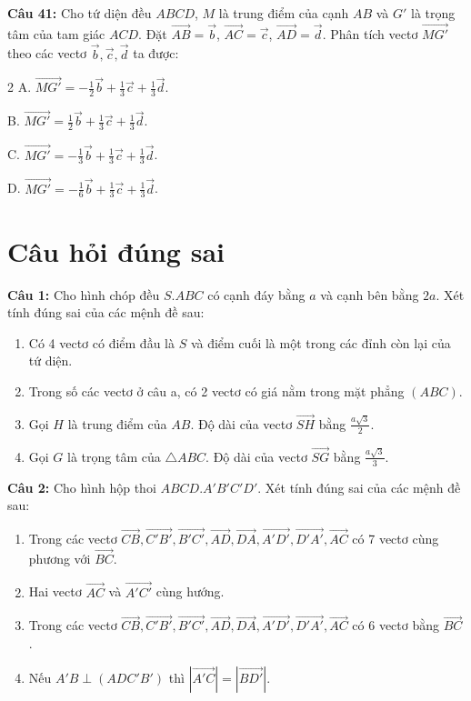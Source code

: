 \documentclass[12pt]{article}
\begin{document}
	\vspace{0.2cm}
	\noindent \textbf{Câu 41:} Cho tứ diện đều $ABCD$, $M$ là trung điểm của cạnh $AB$ và $G'$ là trọng tâm của tam giác $ACD$. Đặt $\overrightarrow{AB} = \vec{b}$, $\overrightarrow{AC} = \vec{c}$, $\overrightarrow{AD} = \vec{d}$. Phân tích vectơ $\overrightarrow{MG'}$ theo các vectơ $\vec{b}, \vec{c}, \vec{d}$ ta được:
	\begin{multicols}{2}
		A. $\overrightarrow{MG'} = -\frac{1}{2}\vec{b} + \frac{1}{3}\vec{c} + \frac{1}{3}\vec{d}$. \par
		B. $\overrightarrow{MG'} = \frac{1}{2}\vec{b} + \frac{1}{3}\vec{c} + \frac{1}{3}\vec{d}$. \par
		C. $\overrightarrow{MG'} = -\frac{1}{3}\vec{b} + \frac{1}{3}\vec{c} + \frac{1}{3}\vec{d}$. \par
		D. $\overrightarrow{MG'} = -\frac{1}{6}\vec{b} + \frac{1}{3}\vec{c} + \frac{1}{3}\vec{d}$.
	\end{multicols}
	\section{Câu hỏi đúng sai}
	
	\noindent \textbf{Câu 1:} Cho hình chóp đều $S.ABC$ có cạnh đáy bằng $a$ và cạnh bên bằng $2a$. Xét tính đúng sai của các mệnh đề sau:
	\begin{enumerate}[label=\alph*)]
		\item Có 4 vectơ có điểm đầu là $S$ và điểm cuối là một trong các đỉnh còn lại của tứ diện.
		\item Trong số các vectơ ở câu a, có 2 vectơ có giá nằm trong mặt phẳng $(ABC)$.
		\item Gọi $H$ là trung điểm của $AB$. Độ dài của vectơ $\overrightarrow{SH}$ bằng $\frac{a\sqrt{3}}{2}$.
		\item Gọi $G$ là trọng tâm của $\triangle ABC$. Độ dài của vectơ $\overrightarrow{SG}$ bằng $\frac{a\sqrt{3}}{3}$.
	\end{enumerate}
	
	\vspace{0.2cm}
	\noindent \textbf{Câu 2:} Cho hình hộp thoi $ABCD.A'B'C'D'$. Xét tính đúng sai của các mệnh đề sau:
	\begin{enumerate}[label=\alph*)]
		\item Trong các vectơ $\overrightarrow{CB}, \overrightarrow{C'B'}, \overrightarrow{B'C'}, \overrightarrow{AD}, \overrightarrow{DA}, \overrightarrow{A'D'}, \overrightarrow{D'A'}, \overrightarrow{AC}$ có 7 vectơ cùng phương với $\overrightarrow{BC}$.
		\item Hai vectơ $\overrightarrow{AC}$ và $\overrightarrow{A'C'}$ cùng hướng.
		\item Trong các vectơ $\overrightarrow{CB}, \overrightarrow{C'B'}, \overrightarrow{B'C'}, \overrightarrow{AD}, \overrightarrow{DA}, \overrightarrow{A'D'}, \overrightarrow{D'A'}, \overrightarrow{AC}$ có 6 vectơ bằng $\overrightarrow{BC}$.
		\item Nếu $A'B \perp (ADC'B')$ thì $|\overrightarrow{A'C}| = |\overrightarrow{BD'}|$.
	\end{enumerate}
	
\end{document}
